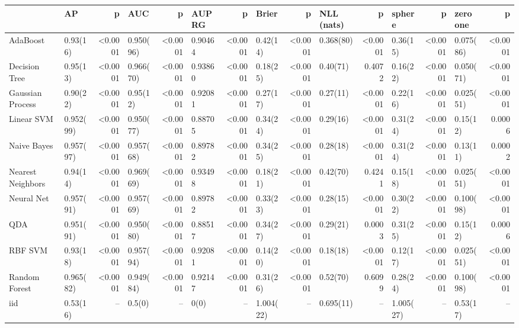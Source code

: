 \documentclass{article}
\begin{document}
{\tiny
\begin{tabular}{|l|l|r|l|r|l|r|l|r|l|r|l|r|l|r|}
\toprule
{}                &       {AP} &      {p} &      {AUC} &      {p} &  {AUPRG} &      {p} &    {Brier} &      {p} & {NLL (nats)} &      {p} &   {sphere} &      {p} & {zero one} &      {p} \\
\midrule
AdaBoost          &  0.93(16)  &  <0.0001 &  0.950(96) &  <0.0001 &  0.90464 &  <0.0001 &  0.42(14)  &  <0.0001 &    0.368(80) &  <0.0001 &  0.36(15)  &  <0.0001 &  0.075(86) &  <0.0001 \\
Decision Tree     &  0.95(13)  &  <0.0001 &  0.966(70) &  <0.0001 &  0.93860 &  <0.0001 &  0.18(25)  &  <0.0001 &    0.40(71)  &   0.4072 &  0.16(22)  &  <0.0001 &  0.050(71) &  <0.0001 \\
Gaussian Process  &  0.90(22)  &  <0.0001 &  0.95(12)  &  <0.0001 &  0.92081 &  <0.0001 &  0.27(17)  &  <0.0001 &    0.27(11)  &  <0.0001 &  0.22(16)  &  <0.0001 &  0.025(51) &  <0.0001 \\
Linear SVM        &  0.952(99) &  <0.0001 &  0.950(77) &  <0.0001 &  0.88705 &  <0.0001 &  0.34(24)  &  <0.0001 &    0.29(16)  &  <0.0001 &  0.31(24)  &  <0.0001 &  0.15(12)  &   0.0006 \\
Naive Bayes       &  0.957(97) &  <0.0001 &  0.957(68) &  <0.0001 &  0.89782 &  <0.0001 &  0.34(25)  &  <0.0001 &    0.28(18)  &  <0.0001 &  0.31(24)  &  <0.0001 &  0.13(11)  &   0.0002 \\
Nearest Neighbors &  0.94(14)  &  <0.0001 &  0.969(69) &  <0.0001 &  0.93498 &  <0.0001 &  0.18(21)  &  <0.0001 &    0.42(70)  &   0.4241 &  0.15(18)  &  <0.0001 &  0.025(51) &  <0.0001 \\
Neural Net        &  0.957(91) &  <0.0001 &  0.957(69) &  <0.0001 &  0.89782 &  <0.0001 &  0.33(23)  &  <0.0001 &    0.28(15)  &  <0.0001 &  0.30(22)  &  <0.0001 &  0.100(98) &  <0.0001 \\
QDA               &  0.951(91) &  <0.0001 &  0.950(80) &  <0.0001 &  0.88517 &  <0.0001 &  0.34(27)  &  <0.0001 &    0.29(21)  &   0.0003 &  0.31(25)  &  <0.0001 &  0.15(12)  &   0.0006 \\
RBF SVM           &  0.93(18)  &  <0.0001 &  0.957(94) &  <0.0001 &  0.92081 &  <0.0001 &  0.14(20)  &  <0.0001 &    0.18(18)  &  <0.0001 &  0.12(17)  &  <0.0001 &  0.025(51) &  <0.0001 \\
Random Forest     &  0.965(82) &  <0.0001 &  0.949(84) &  <0.0001 &  0.92147 &  <0.0001 &  0.31(26)  &  <0.0001 &    0.52(70)  &   0.6099 &  0.28(24)  &  <0.0001 &  0.100(98) &  <0.0001 \\
iid               &  0.53(16)  &     {--} &  0.5(0)    &     {--} &  0(0)    &     {--} &  1.004(22) &     {--} &    0.695(11) &     {--} &  1.005(27) &     {--} &  0.53(17)  &     {--} \\
\bottomrule
\end{tabular}
}
\end{document}
